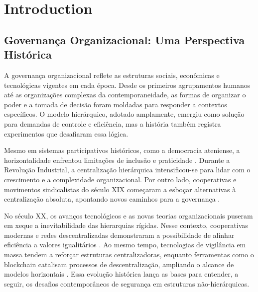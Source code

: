 
%


% 
% 

\chapter{Introduction}
\label{cha:Introduction}

\section{Governança Organizacional: Uma Perspectiva
Histórica} \label{sec:contexto_historico}

A governança organizacional reflete as estruturas sociais,
econômicas e tecnológicas vigentes em cada época. Desde os
primeiros agrupamentos humanos até as organizações complexas
da contemporaneidade, as formas de organizar o poder e a
tomada de decisão foram moldadas para responder a contextos
específicos. O modelo hierárquico, adotado amplamente,
emergiu como solução para demandas de controle e eficiência,
mas a história também registra experimentos que desafiaram
essa lógica.

Mesmo em sistemas participativos históricos, como a
democracia ateniense, a horizontalidade enfrentou limitações
de inclusão e praticidade \cite{AthenianDemocracyABrief}.
Durante a Revolução Industrial, a centralização hierárquica
intensificou-se para lidar com o crescimento e a
complexidade organizacional. Por outro lado, cooperativas e
movimentos sindicalistas do século XIX começaram a esboçar
alternativas à centralização absoluta, apontando novos
caminhos para a governança
\cite{WorkerCooperativesinAmerica, EverydayRevolutions}.

No século XX, os avanços tecnológicos e as novas teorias
organizacionais puseram em xeque a inevitabilidade das
hierarquias rígidas. Nesse contexto, cooperativas modernas e
redes descentralizadas demonstraram a possibilidade de
alinhar eficiência a valores igualitários
\cite{WorkerCooperativesandRevolution}. Ao mesmo tempo,
tecnologias de vigilância em massa tendem a reforçar
estruturas centralizadoras, enquanto ferramentas como o
blockchain catalisam processos de descentralização,
ampliando o alcance de modelos horizontais
\cite{DoArtifactsHavePolitics}. Essa evolução histórica
lança as bases para entender, a seguir, os desafios
contemporâneos de segurança em estruturas não-hierárquicas.

